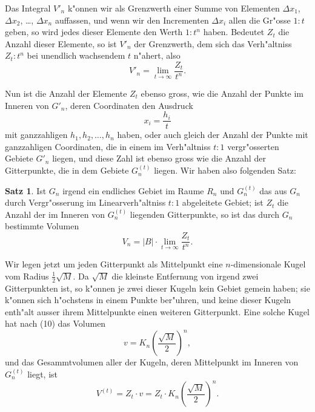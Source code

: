 \documentclass[12pt,a4paper]{article}
\theoremstyle{definition}
\newtheorem*{satz}{Satz}
\begin{document}
Das Integral $V'_n$ k"onnen wir als Grenzwerth einer Summe von Elementen $\Delta x_1$, $\Delta x_2$, \dots, $\Delta x_n$ auffassen, und wenn wir den Incrementen $\Delta x_i$ allen die Gr"osse $1 : t$ geben, so wird jedes dieser Elemente den Werth $1 : t^n$ haben. Bedeutet $Z_t$ die Anzahl dieser Elemente, so ist $V'_n$ der Grenzwerth, dem sich das Verh"altniss $Z_t : t^n$ bei unendlich wachsendem $t$ n"ahert, also
\begin{equation}
V'_n = \lim_{t \to \infty} \frac{Z_t}{t^n}.
\end{equation}

Nun ist die Anzahl der Elemente $Z_t$ ebenso gross, wie die Anzahl der Punkte im Inneren von $G'_n$, deren Coordinaten den Ausdruck
\begin{equation}
x_i = \frac{h_i}{t}
\end{equation}
mit ganzzahligen $h_1, h_2, \dots, h_n$ haben, oder auch gleich der Anzahl der Punkte mit ganzzahligen Coordinaten, die in einem im Verh"altniss $t : 1$ vergr"osserten Gebiete $G'_n$ liegen, und diese Zahl ist ebenso gross wie die Anzahl der Gitterpunkte, die in dem Gebiete $G_n^{(t)}$ liegen. Wir haben also folgenden Satz:

\begin{satz}
Ist $G_n$ irgend ein endliches Gebiet im Raume $R_n$ und $G_n^{(t)}$ das aus $G_n$ durch Vergr"osserung im Linearverh"altniss $t : 1$ abgeleitete Gebiet; ist $Z_t$ die Anzahl der im Inneren von $G_n^{(t)}$ liegenden Gitterpunkte, so ist das durch $G_n$ bestimmte Volumen
\begin{equation}
V_n = |B| \cdot \lim_{t \to \infty} \frac{Z_t}{t^n}.
\end{equation}
\end{satz}

Wir legen jetzt um jeden Gitterpunkt als Mittelpunkt eine $n$-dimensionale Kugel vom Radius $\tfrac{1}{2}\sqrt{M}$. Da $\sqrt{M}$ die kleinste Entfernung von irgend zwei Gitterpunkten ist, so k"onnen je zwei dieser Kugeln kein Gebiet gemein haben; sie k"onnen sich h"ochstens in einem Punkte ber"uhren, und keine dieser Kugeln enth"alt ausser ihrem Mittelpunkte einen weiteren Gitterpunkt. Eine solche Kugel hat nach (10) das Volumen
\begin{equation}
v = K_n \left(\frac{\sqrt{M}}{2}\right)^n,
\end{equation}
und das Gesammtvolumen aller der Kugeln, deren Mittelpunkt im Inneren von $G_n^{(t)}$ liegt, ist
\begin{equation}
V^{(t)} = Z_t \cdot v = Z_t \cdot K_n \left(\frac{\sqrt{M}}{2}\right)^n.
\end{equation}
\end{document}
